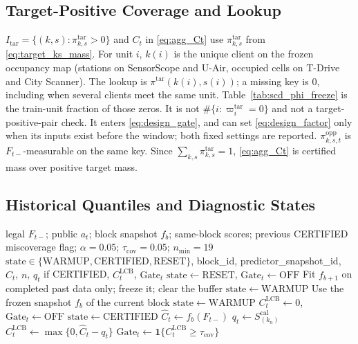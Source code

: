 \subsection{Target-Positive Coverage and Lookup}
$I_{\mathrm{tar}}=\{(k,s):\pi^{\mathrm{tar}}_{k,s}>0\}$ and $C_t$ in
\eqref{eq:agg_Ct} use $\pi^{\mathrm{tar}}_{k,s}$ from \eqref{eq:target_ks_mass}.
For unit $i$, $k(i)$ is the unique client on the frozen occupancy map
(stations on SensorScope and U-Air, occupied cells on T-Drive and City
Scanner). The lookup is $\pi^{\mathrm{tar}}(k(i),s(i))$; a missing key is $0$,
including when several clients meet the same unit. Table~\ref{tab:scd_phi_freeze}
is the train-unit fraction of those zeros. It is not
$\#\{i:\varpi_i^{\mathrm{tar}}=0\}$ and not a target-positive-pair check. It
enters \eqref{eq:design_gate}, and can set \eqref{eq:design_factor} only when
its inputs exist before the window; both fixed settings are reported.
$\pi^{\mathrm{opp}}_{k,s,t}$ is $F_{t-}$-measurable on the same key. Since
$\sum_{k,s}\pi^{\mathrm{tar}}_{k,s}=1$, \eqref{eq:agg_Ct} is certified mass over
positive target mass.

\subsection{Historical Quantiles and Diagnostic States}
\begin{algorithm}[t]
\caption{Aggregate coverage certificate (diagnostic Gate)}
\label{alg:agg_certificate}
\begin{algorithmic}[1]
\REQUIRE legal $F_{t-}$; public $a_t$; block snapshot $f_b$; same-block scores;
previous CERTIFIED miscoverage flag; $\alpha=0.05$; $\tau_{\mathrm{cov}}=0.05$; $n_{\min}=19$
\ENSURE $\mathrm{state}\in\{\mathrm{WARMUP},\mathrm{CERTIFIED},\mathrm{RESET}\}$,
block\_id, predictor\_snapshot\_id, $\widehat C_t$, $n$, $q_t$ if CERTIFIED,
$C^{\mathrm{LCB}}_t$, $\mathrm{Gate}_t$
\STATE $\mathrm{state}\leftarrow\mathrm{RESET}$, $\mathrm{Gate}_t\leftarrow\mathrm{OFF}$
\STATE Fit $f_{b+1}$ on completed past data only; freeze it; clear the buffer
\STATE $\mathrm{state}\leftarrow\mathrm{WARMUP}$
\ELSE
\STATE Use the frozen snapshot $f_b$ of the current block
\STATE $\mathrm{state}\leftarrow\mathrm{WARMUP}$
\STATE $C^{\mathrm{LCB}}_t\leftarrow 0$, $\mathrm{Gate}_t\leftarrow\mathrm{OFF}$
\ELSE
\STATE $\mathrm{state}\leftarrow\mathrm{CERTIFIED}$ 
\STATE $\widehat C_t\leftarrow f_b(F_{t-})$
\STATE $q_t\leftarrow S_{(k_n)}^{\mathrm{cal}}$ 
\STATE $C^{\mathrm{LCB}}_t\leftarrow\max\{0,\widehat C_t-q_t\}$
\STATE $\mathrm{Gate}_t\leftarrow \mathbf{1}\{C^{\mathrm{LCB}}_t\ge\tau_{\mathrm{cov}}\}$
\ENDIF
\ENDIF
\end{algorithmic}
\end{algorithm}

